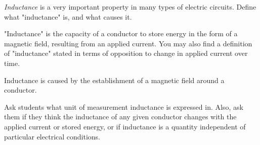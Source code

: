 

{\it Inductance} is a very important property in many types of electric circuits.  Define what "inductance" is, and what causes it.







"Inductance" is the capacity of a conductor to store energy in the form of a magnetic field, resulting from an applied current.  You may also find a definition of "inductance" stated in terms of opposition to change in applied current over time.

\vskip 10pt

Inductance is caused by the establishment of a magnetic field around a conductor.







Ask students what unit of measurement inductance is expressed in.  Also, ask them if they think the inductance of any given conductor changes with the applied current or stored energy, or if inductance is a quantity independent of particular electrical conditions.




